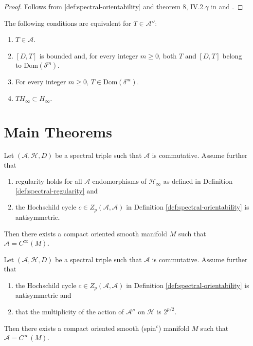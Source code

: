 \begin{proof}
    Follows from \ref{def:spectral-orientability} and theorem 8, IV.2.$\gamma$ in \cite{Connes1994} and \cite{Figueroa2000}.
\end{proof}


\begin{lemma}[Lemma 2.1]\label{lem:lemma-2.1}
    The following conditions are equivalent for $T\in \mathcal{A}''$:
    \begin{enumerate}
    \item $T\in \mathcal{A}$.
    \item $[D,T]$ is bounded and, for every integer $m\ge 0$, both $T$ and $[D,T]$ belong to $\textrm{Dom}(\delta^{m})$.
    \item For every integer $m\ge 0$, $T\in \textrm{Dom}(\delta^{m})$.
    \item $T H_\infty \subset H_\infty$.
    \end{enumerate}
\end{lemma}



\section{Main Theorems}

\begin{theorem}\label{thm:reconstruction-theorem-1.1}
    Let $(\mathcal{A}, \mathcal{H}, D)$ be a spectral triple such that $\mathcal{A}$ is commutative. Assume further that
    \begin{enumerate}
        \item regularity holds for all $\mathcal{A}$-endomorphisms of $\mathcal{H}_\infty$ as defined in Definition \ref{def:spectral-regularity} and
        \item the Hochschild cycle $c \in Z_p(\mathcal{A},\mathcal{A})$ in Definition \ref{def:spectral-orientability} is antisymmetric.
    \end{enumerate}
    Then there exists a compact oriented smooth manifold $M$ such that $\mathcal{A} = C^\infty(M)$.
\end{theorem}
    

\begin{theorem}\label{thm:reconstruction-theorem-1.2}
    Let $(\mathcal{A}, \mathcal{H}, D)$ be a spectral triple such that $\mathcal{A}$ is commutative. Assume further that
    \begin{enumerate}
        \item the Hochschild cycle $c \in Z_p(\mathcal{A},\mathcal{A})$ in Definition \ref{def:spectral-orientability} is antisymmetric and
        \item that the multiplicity of the action of $\mathcal{A}''$ on $\mathcal{H}$ is $2^{p/2}$.
    \end{enumerate}
    Then there exists a compact oriented smooth (spin$^c$) manifold $M$ such that $\mathcal{A} = C^\infty(M)$.
\end{theorem}    



